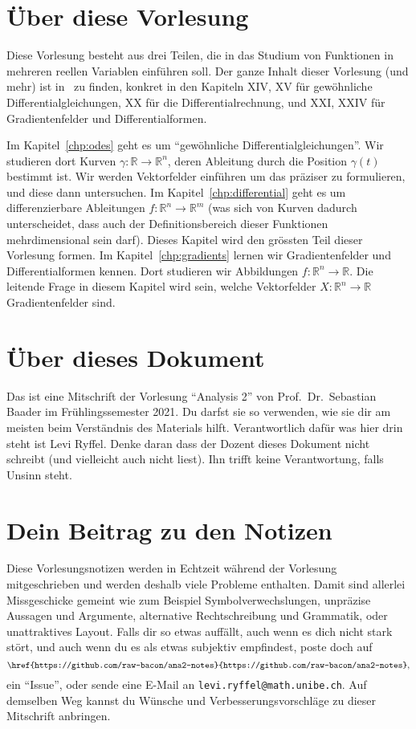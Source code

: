 \documentclass[../main.tex]{subfiles}
\begin{document}
\section*{Über diese Vorlesung}
Diese Vorlesung besteht aus drei Teilen,
die in das Studium von Funktionen
in mehreren reellen Variablen
einführen soll. Der ganze Inhalt
dieser Vorlesung (und mehr) ist in~\cite{heuser}
zu finden,
konkret in den Kapiteln XIV, XV für
gewöhnliche Differentialgleichungen,
XX für die Differentialrechnung,
und XXI, XXIV für Gradientenfelder
und Differentialformen.

Im Kapitel~\ref{chp:odes} geht es um
``gewöhnliche Differentialgleichungen''.
Wir studieren dort Kurven
$\gamma \colon \mathbb{R} \to \mathbb{R}^n$,
deren Ableitung durch die
Position $\gamma(t)$ bestimmt ist.
Wir werden Vektorfelder einführen
um das präziser zu formulieren,
und diese dann untersuchen.
Im Kapitel~\ref{chp:differential}
geht es um differenzierbare
Ableitungen 
$f \colon \mathbb{R}^n \to \mathbb{R}^m$ 
(was sich von Kurven dadurch unterscheidet,
dass auch der Definitionsbereich
dieser Funktionen mehrdimensional sein darf).
Dieses Kapitel wird den grössten Teil
dieser Vorlesung formen.
Im Kapitel~\ref{chp:gradients} lernen
wir Gradientenfelder und Differentialformen
kennen. Dort studieren wir
Abbildungen $f \colon\mathbb{R}^n \to \mathbb{R}$.
Die leitende Frage in diesem Kapitel wird sein,
welche Vektorfelder $X \colon \mathbb{R}^n
\to \mathbb{R}$ Gradientenfelder sind.




\section*{Über dieses Dokument}
Das ist eine Mitschrift
der Vorlesung ``Analysis 2''
von Prof.\ Dr.\ Sebastian Baader
im Frühlingssemester 2021.
Du darfst sie so verwenden,
wie sie dir am meisten
beim Verständnis des Materials
hilft.
Verantwortlich dafür was
hier drin steht ist Levi Ryffel.
Denke daran dass der Dozent dieses Dokument
nicht schreibt (und vielleicht auch nicht liest).
Ihn trifft keine Verantwortung, falls
Unsinn steht.

\section*{Dein Beitrag zu den Notizen}
Diese Vorlesungsnotizen werden in Echtzeit während der Vorlesung mitgeschrieben
und werden deshalb viele Probleme enthalten.
Damit sind allerlei Missgeschicke
gemeint wie zum Beispiel
Symbolverwechslungen, unpräzise Aussagen und Argumente,
alternative Rechtschreibung und Grammatik,
oder unattraktives Layout.
Falls dir so etwas auffällt,
auch wenn es dich nicht stark stört,
und auch wenn du es
als etwas subjektiv empfindest,
poste doch auf
\[
\texttt{\href{https://github.com/raw-bacon/ana2-notes}{https://github.com/raw-bacon/ana2-notes}},
\]
ein ``Issue'', oder sende
eine E-Mail an \texttt{levi.ryffel@math.unibe.ch}.
Auf demselben Weg kannst du Wünsche
und Verbesserungsvorschläge
zu dieser Mitschrift
anbringen.
\end{document}

